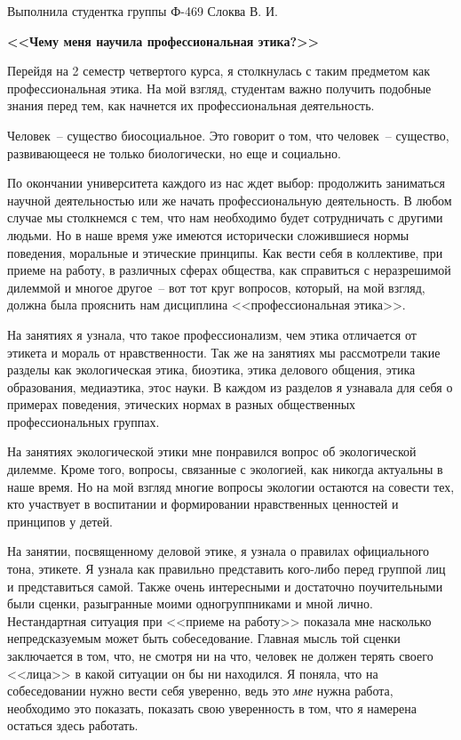 \documentclass[14pt,pscyr]{hedwork}
\begin{document}
  \onehalfspacing

  \begin{flushright}
    Выполнила студентка группы Ф-469 Слоква В. И.
  \end{flushright}
  \vspace{-2em}
  \begin{center}
    \bfseries <<Чему меня научила профессиональная этика?>>
  \end{center}
  
  Перейдя на 2 семестр четвертого курса, я столкнулась с таким предметом как
  профессиональная этика. На мой взгляд, студентам важно получить подобные
  знания перед тем, как начнется их профессиональная деятельность.
  
  Человек~-- существо биосоциальное. Это говорит о том, что человек~--
  существо, развивающееся не только биологически, но еще и социально.
  
  По окончании университета каждого из нас ждет выбор: продолжить заниматься
  научной деятельностью или же начать профессиональную деятельность. В любом
  случае мы столкнемся с тем, что нам необходимо будет сотрудничать с другими
  людьми. Но в наше время уже имеются исторически сложившиеся нормы поведения,
  моральные и этические принципы. Как вести себя в коллективе, при приеме на
  работу, в различных сферах общества, как справиться с неразрешимой дилеммой
  и многое другое~-- вот тот круг вопросов, который, на мой взгляд, должна была
  прояснить нам дисциплина <<профессиональная этика>>.
  
  На занятиях я узнала, что такое профессионализм, чем этика отличается от
  этикета и мораль от нравственности. Так же на занятиях мы рассмотрели такие
  разделы как экологическая этика, биоэтика, этика делового общения, этика
  образования, медиаэтика, этос науки. В каждом из разделов я узнавала для себя
  о примерах поведения, этических нормах в разных общественных профессиональных
  группах.
  
  На занятиях экологической этики мне понравился вопрос об экологической
  дилемме. Кроме того, вопросы, связанные с экологией, как никогда актуальны
  в наше время. Но на мой взгляд многие вопросы экологии остаются на совести
  тех, кто участвует в воспитании и формировании нравственных ценностей и
  принципов у детей.
  
  На занятии, посвященному деловой этике, я узнала о правилах официального
  тона, этикете. Я узнала как правильно представить кого-либо перед группой лиц
  и представиться самой. Также очень интересными и достаточно поучительными
  были сценки, разыгранные моими одногруппниками и мной лично. Нестандартная
  ситуация при <<приеме на работу>> показала мне насколько непредсказуемым
  может быть собеседование. Главная мысль той сценки заключается в том, что, не
  смотря ни на что, человек не должен терять своего <<лица>> в какой ситуации он
  бы ни находился. Я поняла, что на собеседовании нужно вести себя уверенно,
  ведь это \emph{мне} нужна работа, необходимо это показать, показать свою
  уверенность в том, что я намерена остаться здесь работать.
  
\end{document}
